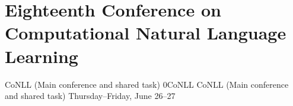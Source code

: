 \chapter[CoNLL: Thursday--Friday, June 26--27]{Eighteenth Conference on Computational Natural Language Learning}
\thispagestyle{emptyheader}
\vfill



\clearpage
\begin{wsschedule}
{CoNLL (Main conference and shared task)}
{0}{CoNLL}
{CoNLL (Main conference and shared task)}
{Thursday--Friday, June 26--27}{\CoNLLLoc}


\end{wsschedule}
